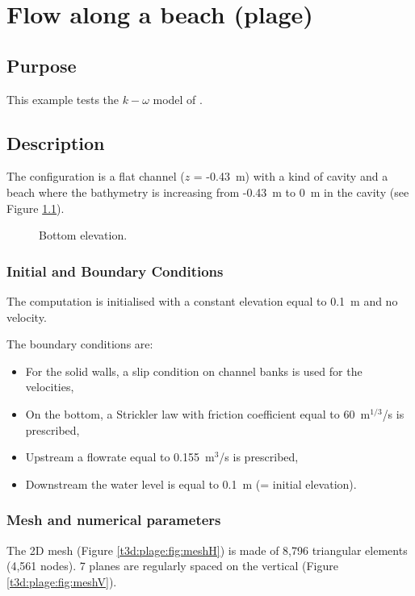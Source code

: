 \chapter{Flow along a beach (plage)}

\section{Purpose}

This example tests the $k-\omega$ model of .

\section{Description}

The configuration is a flat channel ($z$ = -0.43~m) with a kind of cavity and a
beach where the bathymetry is increasing from -0.43~m to 0~m in the cavity
(see Figure \ref{t3d:plage:fig:Bottom}).

\begin{figure}[!htbp]
 \centering
 \caption{Bottom elevation.}
 \label{t3d:plage:fig:Bottom}
\end{figure}

\subsection{Initial and Boundary Conditions}

The computation is initialised with a constant elevation equal to 0.1~m
and no velocity.

The boundary conditions are:
\begin{itemize}
\item For the solid walls, a slip condition on channel banks is used for the
velocities,
\item On the bottom, a Strickler law with friction coefficient equal to
60~m$^{1/3}$/s is prescribed,
\item Upstream a flowrate equal to 0.155~m$^3$/s is prescribed,
\item Downstream the water level is equal to 0.1~m (= initial elevation).
\end{itemize}

\subsection{Mesh and numerical parameters}

The 2D mesh (Figure \ref{t3d:plage:fig:meshH})
is made of 8,796 triangular elements (4,561 nodes).
7 planes are regularly spaced on the vertical (Figure \ref{t3d:plage:fig:meshV}).

